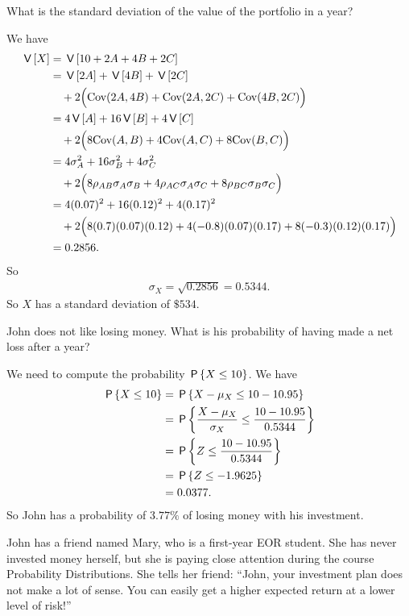 \begin{exercise}
What is the standard deviation of the value of the portfolio in a year?
\begin{solution}
We have
\begin{align}
    \V{X} &= \V{ 10 + 2A + 4B + 2C} \\
    &= \V{2A} + \V{4B} + \V{2C} \\
    &\quad +2\Big( \covv(2A, 4B) + \covv(2A, 2C) + \covv(4B, 2C) \Big) \\
    &= 4\V{A} + 16\V{B} + 4\V{C}\\
    &\quad +2\Big( 8\covv(A, B) + 4\covv(A, C) + 8\covv(B, C) \Big) \\
    &= 4\sigma_A^2 + 16\sigma_B^2 + 4\sigma_C^2 \\
    &\quad +2\Big( 8\rho_{AB}\sigma_A \sigma_B + 4\rho_{AC}\sigma_A \sigma_C + 8\rho_{BC}\sigma_B \sigma_C \Big) \\
    &= 4(0.07)^2 + 16(0.12)^2 + 4(0.17)^2 \\
    &\quad +2\Big( 8(0.7)(0.07) (0.12) + 4(-0.8)(0.07)(0.17) + 8(-0.3)(0.12) (0.17)\Big) \\
    &= 0.2856.
\end{align}
So
\begin{align}
    \sigma_X = \sqrt{0.2856} = 0.5344.
\end{align}
So $X$ has a standard deviation of $\$534$.
\end{solution}
\end{exercise}

\begin{exercise}
John does not like losing money. What is his probability of having made a net loss after a year?
\begin{solution}
We need to compute the probability $\P{X \leq 10}$. We have
\begin{align}
    \P{X \leq 10}
 &= \P{ X - \mu_X \leq 10 - 10.95} \\
    &= \P{ \frac{X - \mu_X}{\sigma_X} \leq \frac{10 - 10.95}{0.5344} } \\
    &= \P{ Z \leq \frac{10 - 10.95}{0.5344} } \\
    &= \P{ Z \leq -1.9625 } \\
    &= 0.0377.
\end{align}
So John has a probability of $3.77\%$ of losing money with his investment.
\end{solution}
\end{exercise}

John has a friend named Mary, who is a first-year EOR student. She has never invested money herself, but she is paying close attention during the course Probability Distributions. She tells her friend: ``John, your investment plan does not make a lot of sense. You can easily get a higher expected return at a lower level of risk!''

